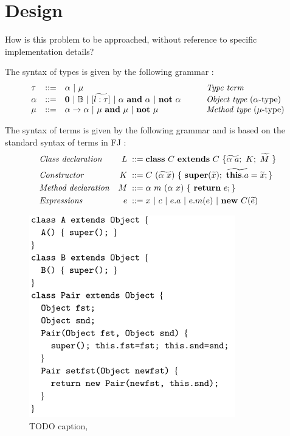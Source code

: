 \documentclass{l4proj}
\begin{document}
\chapter{Design}
How is this problem to be approached, without reference to specific implementation details?


\label{sec:design}
The syntax of types is given by the following grammar \citep{Dardha2013,Dardha2017}:
$$
    \begin{array}{llll}
        \tau   & ::=                                       & \alpha \ |\ \mu
               & \mbox{{\em Type term}}
        \\
        \alpha & ::=                                       & \zero \ |\ \btypes \ |\ [\wt{l:\tau}] \ |\ \alpha \ \bf{and}\ \alpha \ |\ \bf{not}\ \alpha
        \qquad
               & \mbox{{\em Object type} ($\alpha $-type)}
        \\
        \mu    & ::=                                       & \alpha \to \alpha \ |\ \mu \ \bf{and}\ \mu \ |\ \bf{not}\ \mu
               & \mbox{{\em Method type} ($\mu $-type)}
    \end{array}
$$

The syntax of terms is given by the following grammar and is based on the standard syntax of terms in FJ \cite{Igarashi1999,Dardha2013,Dardha2017}:
\begin{align*}
     & \mbox{\textit{Class declaration}}  & L \; ::= \; & \syndecl{C}{C}{\wt{\alpha \ a};\ K; \ \wt{M}\ }                         \\
     & \mbox{\textit{Constructor}}        & K \;::=\;   & C\ (\wt{\alpha\ x})\ \{\ \synsuper(\wt{x});\ \wt{\synthis.a}=\wt{x}; \} \\
     & \mbox{\textit{Method declaration}} & M \; ::= \; & \alpha \ m\ (\alpha \ x)\ \{\ \synret e; \}                             \\
     & \mbox{\textit{Expressions}}        & e \; ::=\;  & x\ |\  c\ |\ e.a\ |\ e.m(e) \ | \ \synnew C(\wt{e})
\end{align*}

\begin{figure}
    \centering
    \includegraphics[width=0.4\linewidth]{images/class.PNG}
    \caption{TODO caption, \citep{Igarashi1999}}
    \label{fig:class}
\end{figure}
\end{document}

